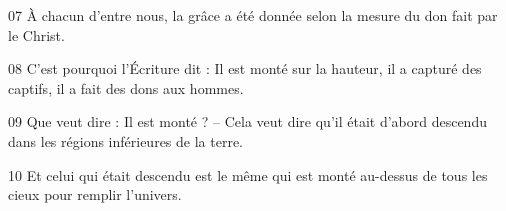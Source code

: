 
07 À chacun d’entre nous, la grâce a été donnée selon la mesure du don fait par le Christ.

08 C’est pourquoi l’Écriture dit : Il est monté sur la hauteur, il a capturé des captifs, il a fait des dons aux hommes.

09 Que veut dire : Il est monté ? – Cela veut dire qu’il était d’abord descendu dans les régions inférieures de la terre.

10 Et celui qui était descendu est le même qui est monté au-dessus de tous les cieux pour remplir l’univers.
